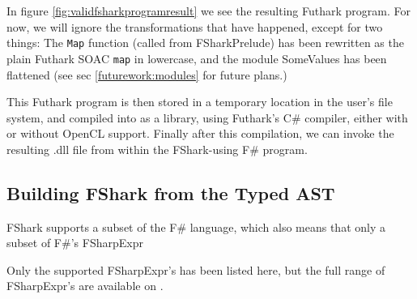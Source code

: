 In figure \ref{fig:validfsharkprogramresult} we see the resulting Futhark program.
For now, we will ignore the transformations that have happened, except for two
things: The \texttt{Map} function (called from FSharkPrelude) has been rewritten
as the plain Futhark SOAC \texttt{map} in lowercase, and the module SomeValues has been
flattened (see sec \ref{futurework:modules} for future plans.)

This Futhark program is then stored in a temporary location in the user's file
system, and compiled into as a library, using Futhark's C\# compiler, either
with or without OpenCL support. Finally after this compilation, we can invoke
the resulting .dll file from within the FShark-using F\# program.

\subsection{Building FShark from the Typed AST}
\label{sec:fsharkcompilerrules}
FShark supports a subset of the F\# language, which also means that only a
subset of F\#'s FSharpExpr

Only the supported FSharpExpr's has been listed here, but the full range of
FSharpExpr's are available on \cite{typedtree}.

